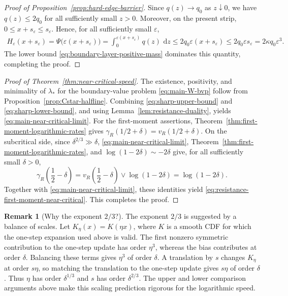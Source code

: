\documentclass[12pt]{amsart}
\numberwithin{equation}{section}
\theoremstyle{plain}
\theoremstyle{definition}
\newtheorem{remark}[theorem]{Remark}
\newcommand{\dd}{\,\mathrm d}
\begin{document}
\begin{proof}[Proof of Proposition~\ref{prop:hard-edge-barrier}]
Since $q(z)\to q_0$ as $z\downarrow0$, we have
$q(z)\le2q_0$ for all sufficiently small $z>0$.  Moreover, on the
present strip, $0\le x+s_\varepsilon\le s_\varepsilon$.  Hence, for all
sufficiently small $\varepsilon$,
\[
\begin{aligned}
 H_\varepsilon(x+s_\varepsilon)
 =\Psi\bigl(\varepsilon(x+s_\varepsilon)\bigr)
 =\int_0^{\varepsilon(x+s_\varepsilon)}q(z)\,\dd z
 \le2q_0\varepsilon(x+s_\varepsilon)
 \le2q_0\varepsilon s_\varepsilon
 =2\kappa q_0\varepsilon^3.
\end{aligned}
\]
  The lower bound
\eqref{eq:boundary-layer-positive-mass} dominates this quantity, completing
the proof.
\end{proof}


\begin{proof}[Proof of Theorem~\ref{thm:near-critical-speed}]
The existence, positivity, and minimality of $\lambda_*$ for the
boundary-value problem \eqref{eq:main-W-bvp} follow from
Proposition~\ref{prop:Cstar-halfline}.
  Combining \eqref{eq:sharp-upper-bound} and
\eqref{eq:sharp-lower-bound}, and using
Lemma~\ref{lem:resistance-duality}, yields
\eqref{eq:main-near-critical-limit}.
For the first-moment assertions, Theorem~\ref{thm:first-moment-logarithmic-rates}
gives
$\gamma_R(1/2+\delta)=v_R(1/2+\delta)$.  On the subcritical side, since
$\delta^{2/3}\gg\delta$, \eqref{eq:main-near-critical-limit},
Theorem~\ref{thm:first-moment-logarithmic-rates}, and
$\log(1-2\delta)\sim-2\delta$ give, for all sufficiently small $\delta>0$,
\[
 \gamma_R\left(\frac12-\delta\right)
 =v_R\left(\frac12-\delta\right)\vee\log(1-2\delta)
 =\log(1-2\delta).
\]
Together with \eqref{eq:main-near-critical-limit}, these identities yield
\eqref{eq:resistance-first-moment-near-critical}.  This completes the proof.
\end{proof}


\begin{remark}[Why the exponent $2/3$?]
\label{rem:two-thirds-heuristic}
The exponent $2/3$ is suggested by a balance of scales. Let
$K_\eta(x)=K(\eta x)$, where $K$ is a smooth CDF for which the one-step
expansion used above is valid. The first nonzero symmetric contribution to the one-step
update has order $\eta^3$, whereas the bias contributes at order $\delta$.
Balancing these terms gives $\eta^3$ of order $\delta$. A translation by $s$
changes $K_\eta$ at order $s\eta$, so matching the translation to the one-step
update gives $s\eta$ of order $\delta$. Thus $\eta$ has order
$\delta^{1/3}$ and $s$ has order $\delta^{2/3}$. The upper and lower comparison
arguments above make this scaling prediction rigorous for the logarithmic speed.
\end{remark}
\end{document}
